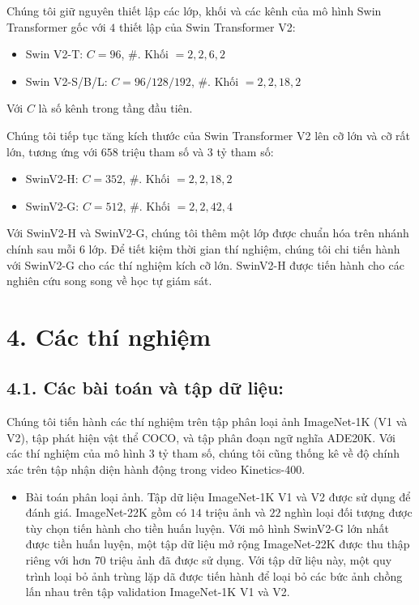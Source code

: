 \documentclass[times, twocolumn]{zHenriquesLab-StyleBioRxiv}
\begin{document}
Chúng tôi giữ nguyên thiết lập các lớp, khối và các kênh của mô hình Swin Transformer gốc với $4$ thiết lập của Swin Transformer V2:
\begin{itemize}
    \item Swin V2-T: $C = 96$, \#. Khối $= {2,2,6,2}$
    \item Swin V2-S/B/L: $C=96/128/192$, \#. Khối $= {2,2,18,2}$
\end{itemize}

Với $C$ là số kênh trong tầng đầu tiên.

Chúng tôi tiếp tục tăng kích thước của Swin Transformer V2 lên cỡ lớn và cỡ rất lớn, tương ứng với $658$ triệu tham số và $3$ tỷ tham số:
\begin{itemize}
    \item SwinV2-H: $C = 352$, \#. Khối $= {2, 2, 18,2}$
    \item SwinV2-G: $C = 512$, \#. Khối $= {2,2,42,4}$
\end{itemize}

Với SwinV2-H và SwinV2-G, chúng tôi thêm một lớp được chuẩn hóa trên nhánh chính sau mỗi $6$ lớp. Để tiết kiệm thời gian thí nghiệm, chúng tôi chi tiến hành với SwinV2-G cho các thí nghiệm kích cỡ lớn. SwinV2-H được tiến hành cho các nghiên cứu song song về học tự giám sát.

\section*{4. Các thí nghiệm}
\subsection*{4.1. Các bài toán và tập dữ liệu:}
Chúng tôi tiến hành các thí nghiệm trên tập phân loại ảnh ImageNet-1K (V1 và V2), tập phát hiện vật thể COCO, và tập phân đoạn ngữ nghĩa ADE20K. Với các thí nghiệm của mô hình $3$ tỷ tham số, chúng tôi cũng thống kê về độ chính xác trên tập nhận diện hành động trong video Kinetics-400.

\begin{itemize}
    \item Bài toán phân loại ảnh. Tập dữ liệu ImageNet-1K V1 và V2 được sử dụng để đánh giá. ImageNet-22K gồm có $14$ triệu ảnh và $22$ nghìn loại đối tượng được tùy chọn tiến hành cho tiền huấn luyện. Với mô hình SwinV2-G lớn nhất được tiền huấn luyện, một tập dữ liệu mở rộng ImageNet-22K được thu thập riêng với hơn $70$ triệu ảnh đã được sử dụng. Với tập dữ liệu này, một quy trình loại bỏ ảnh trùng lặp dã được tiến hành để loại bỏ các bức ảnh chồng lấn nhau trên tập validation ImageNet-1K V1 và V2.
\end{itemize}
\end{document}
